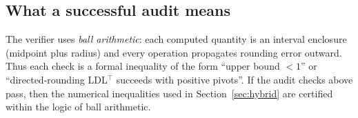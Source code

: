 \documentclass[11pt]{article}
\begin{document}
\subsection*{What a successful audit means}
The verifier uses \emph{ball arithmetic}: each computed quantity is an interval enclosure (midpoint plus radius) and every operation propagates rounding error outward.
Thus each check is a formal inequality of the form ``upper bound $<1$'' or ``directed-rounding LDL$^\top$ succeeds with positive pivots''.
If the audit checks above pass, then the numerical inequalities used in Section~\ref{sec:hybrid} are certified within the logic of ball arithmetic.


\end{document}
